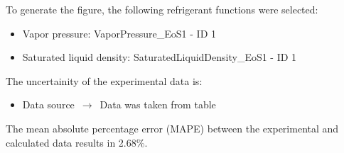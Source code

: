 To generate the figure, the following refrigerant functions were selected:
\begin{itemize}
\item Vapor pressure: VaporPressure\_EoS1 - ID 1
\item Saturated liquid density: SaturatedLiquidDensity\_EoS1 - ID 1
\end{itemize}

The uncertainity of the experimental data is:
\begin{itemize}
\item Data source $\,\to\,$ Data was taken from table
\end{itemize}

The mean absolute percentage error (MAPE) between the experimental and calculated data results in 2.68\%.
\FloatBarrier
\newpage
